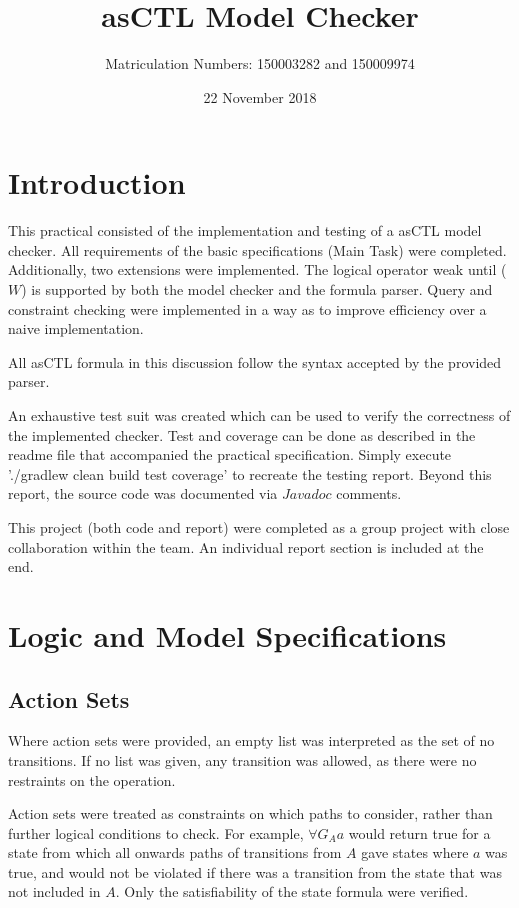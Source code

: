 \documentclass[a4paper,11pt]{article}
\title{asCTL Model Checker}
\author{Matriculation Numbers: 150003282 and 150009974}
\date{22 November 2018}
\begin{document}
	
	\maketitle
	
	\pagebreak
	\section{Introduction}
	This practical consisted of the implementation and testing of a asCTL model checker. All requirements of the basic specifications (Main Task) were completed. Additionally, two extensions were implemented. The logical operator weak until ($W$) is supported by both the model checker and the formula parser. Query and constraint checking were implemented in a way as to improve efficiency over a naive implementation.
	
	All asCTL formula in this discussion follow the syntax accepted by the provided parser.
	
	An exhaustive test suit was created which can be used to verify the correctness of the implemented checker. Test and coverage can be done as described in the readme file that accompanied the practical specification. Simply execute './gradlew clean build test coverage' to recreate the testing report. Beyond this report, the source code was documented via $Java doc$ comments.
	
	This project (both code and report) were completed as a group project with close collaboration within the team. An individual report section is included at the end. 
	
	\section{Logic and Model Specifications}
	\subsection{Action Sets}
	Where action sets were provided, an empty list was interpreted as the set of no transitions. If no list was given, any transition was allowed, as there were no restraints on the operation.
	
	Action sets were treated as constraints on which paths to consider, rather than further logical conditions to check. For example, $\forall G{_Aa}$ would return true for a state from which all onwards paths of transitions from $A$ gave states where $a$ was true, and would not be violated if there was a transition from the state that was not included in $A$. Only the satisfiability of the state formula were verified.
	
\end{document}
